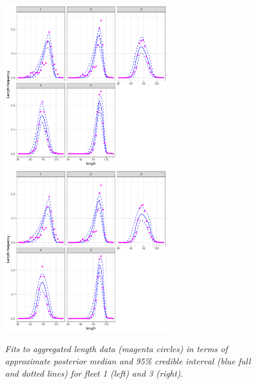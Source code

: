 \documentclass[12pt,a4paper,twoside,times,sky,standard]{csiroreport2017}
\begin{document}
\begin{figure}[hb]
    \begin{center}
       \includegraphics[width=7cm,height=7cm]{figs/case4_lffits.pdf}\includegraphics[width=7cm,height=7cm]{figs/case4a_lffits.pdf} 
    \end{center}
    \caption{\textit{Fits to aggregated length data (magenta circles) in terms of approximate posterior
median and 95\% credible interval (blue full and dotted lines) for fleet 1 (left) and 3 (right).}}
\end{figure}
\end{document}
